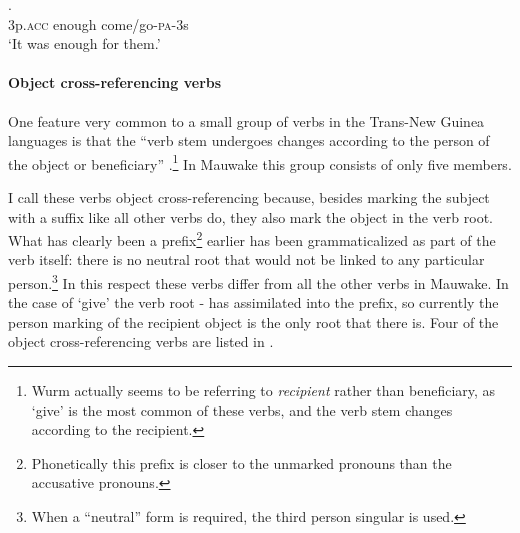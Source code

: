 \ea%
\label{ex:x306}
\gll {}  . \\
3p.\textsc{acc} enough come/go-\textsc{pa}-3s \\
\glt`It was enough for them.'
\z

\paragraph[Object cross-referencing verbs]{Object cross-referencing verbs}
{}
One feature very common to a small group of verbs in the Trans-New Guinea languages is that the ``{verb stem undergoes changes according to the person of the object or beneficiary}'' \citep[62]{Wurm1982}.\footnote{Wurm actually seems to be referring to \textit{recipient} rather than beneficiary, as `give' is the most common of these verbs, and the verb stem changes according to the recipient.} In Mauwake this group consists of only five members. 

I call these verbs object cross-referencing because, besides marking the subject with a suffix like all other verbs do, they also  mark the object in the verb root. What has clearly been a prefix\footnote{Phonetically this prefix is closer to the unmarked pronouns than the accusative pronouns.} earlier has been grammaticalized as part of the verb itself: there is no neutral root that would not be linked to any particular person.\footnote{When a ``neutral'' form is required, the third person singular is used.} In this respect these verbs differ from all the other verbs in Mauwake. In the case of `give' the verb root - has assimilated into the prefix, so currently the person marking of the recipient object is the only root that there is. Four of the object cross-referencing verbs are listed in .

\begin{table}
 \caption{Cross-referencing verbs}
\label{tab:3:crossreferencingverbs}
\end{table}


